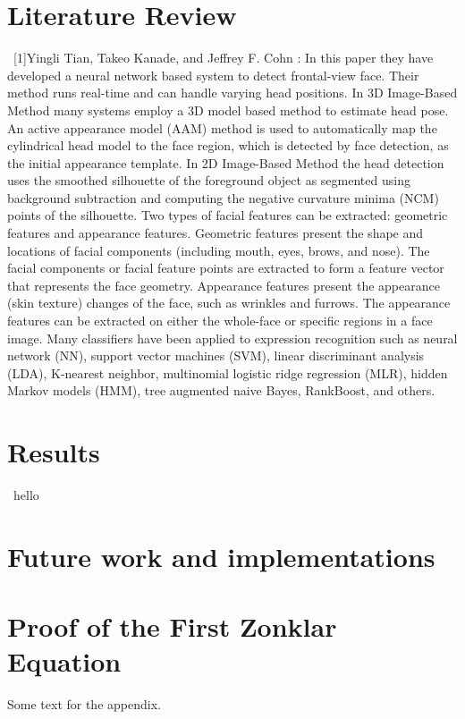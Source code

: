 \documentclass[journal]{IEEEtran}
\begin{document}
\section{Literature Review}
\ [1]Yingli Tian, Takeo Kanade, and Jeffrey F. Cohn : In this paper they have developed a neural network based system to detect frontal-view face. Their method runs real-time and can handle varying head positions. In 3D Image-Based Method many systems employ a 3D model based method to estimate head pose. An active appearance model (AAM) method is used to automatically map the cylindrical head model to the face region, which is detected by face detection, as the initial appearance template. In 2D Image-Based Method the head detection uses the smoothed silhouette of the foreground object as segmented using background subtraction and computing the negative curvature minima (NCM) points of the silhouette.
 Two types of facial features can be extracted: geometric features and appearance features. Geometric features present the shape and locations of facial components (including mouth, eyes, brows, and nose). The facial components or facial feature points are extracted to form a feature vector that represents the face geometry. Appearance features present the appearance (skin texture) changes of the face, such as wrinkles and furrows. The appearance features can be extracted on either the whole-face or specific regions in a face image. Many classifiers have been applied to expression recognition such as neural network (NN), support vector machines (SVM), linear discriminant analysis (LDA), K-nearest neighbor, multinomial logistic ridge regression (MLR), hidden Markov models (HMM), tree augmented naive Bayes, RankBoost, and others.

\section{Results}
\ hello

\section{Future work and implementations}


%


\appendices
\section{Proof of the First Zonklar Equation}
Some text for the appendix.

\end{document}
